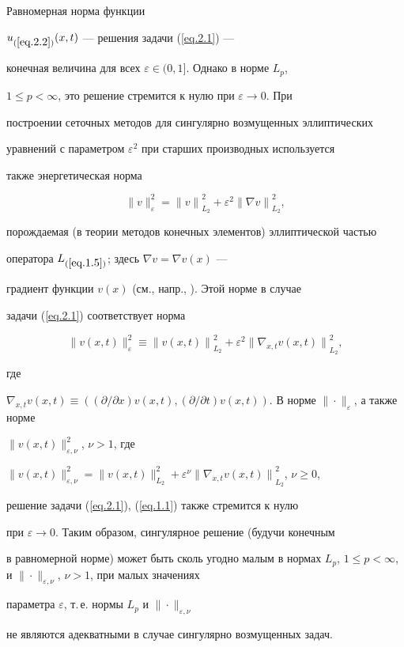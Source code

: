 \begin{notenonum}


Равномерная норма функции


$u_{(\ref{eq.2.2})}(x, t)$ --- решения задачи (\ref{eq.2.1}) ---


конечная величина для всех $\varepsilon\in (0, 1]$. Однако в норме $L_p$,


$1\le p< \infty$, это решение стремится к нулю при $\varepsilon\to 0$. При


построении сеточных методов для сингулярно возмущенных эллиптических


уравнений с параметром $\varepsilon^2$ при старших производных используется


также энергетическая норма


$$


\| v\|^2_\varepsilon=


{\| v\|}^2_{L_2}+\varepsilon^2 {\|\nabla v\|}^2_{L_2},


$$


порождаемая (в теории методов конечных элементов) эллиптической частью


оператора $L_{(\ref{eq.1.5})}$; здесь $\nabla v=\nabla v(x)$ ---


градиент функции $v(x)$ (см., напр., \cite{7}). Этой норме в случае


задачи (\ref{eq.2.1}) соответствует норма


$$


\| v(x, t)\|^2_\varepsilon\equiv {\| v(x, t)\|}^2_{L_2}+\varepsilon^2


{\|\nabla_{x, t} v(x, t)\|}^2_{L_2},


$$


где


$\nabla_{x, t}v(x, t)\equiv((\partial/ \partial x) v(x, t), (\partial/


\partial t) v(x, t))$. В норме $\| \cdot \|_\varepsilon$, а также норме


$\|v(x, t) \|^2_{\varepsilon, \nu}$, $\nu> 1$, где


$\| v(x, t)\|^2_{\varepsilon, \nu}= \| v(x, t)\|^2_{L_2}+\varepsilon^\nu


{\|\nabla_{x, t} v(x, t)\|}^2_{L_2}$, $\nu\ge 0$,


решение задачи (\ref{eq.2.1}), (\ref{eq.1.1}) также стремится к нулю


при $\varepsilon\to 0$. Таким образом, сингулярное решение (будучи конечным


в равномерной норме) может быть сколь угодно малым в нормах $L_p$, $1\le


p< \infty$, и $\|\cdot\|_{\varepsilon,\nu}$, $\nu>1$, при малых значениях


параметра $\varepsilon$, т.\,е. нормы $L_p$ и $\|\cdot\|_{\varepsilon,\nu}$


не являются адекватными в случае сингулярно возмущенных задач.


\end{notenonum}





